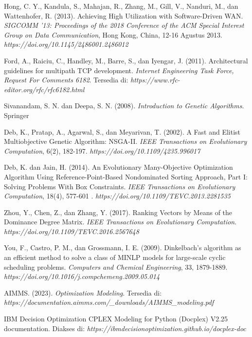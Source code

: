 \begin{thebibliography}{99}
Hong, C. Y., Kandula, S., Mahajan, R., Zhang, M., Gill, V., Nanduri, M., dan Wattenhofer, R. (2013). Achieving High Utilization with Software-Driven WAN. \textit{SIGCOMM '13: Proceedings of the 2018 Conference of the ACM Special Interest Group on Data Communication}, Hong Kong, China, 12-16 Agustus 2013. \textit{https://doi.org/10.1145/2486001.2486012}

Ford, A., Raiciu, C., Handley, M., Barre, S., dan Iyengar, J. (2011). Architectural guidelines for multipath TCP development. \textit{Internet Engineering Task Force, Request For Comments 6182}. Tersedia di: \textit{https://www.rfc-editor.org/rfc/rfc6182.html}

Sivanandam, S. N. dan Deepa, S. N. (2008). \textit{Introduction to Genetic Algorithms}. Springer 


Deb, K., Pratap, A., Agarwal, S., dan Meyarivan, T. (2002). A Fast and Elitist Multiobjective Genetic Algorithm: NSGA-II. \textit{IEEE Transactions on Evolutionary Computation}, 6(2), 182-197. \textit{https://doi.org/10.1109/4235.996017}

Deb, K. dan Jain, H. (2014). An Evolutionary Many-Objective Optimization Algorithm Using Reference-Point-Based Nondominated Sorting Approach, Part I: Solving Problems With Box Constraints. \textit{IEEE Transactions on Evolutionary Computation}, 18(4), 577-601 . \textit{https://doi.org/10.1109/TEVC.2013.2281535}

Zhou, Y., Chen, Z., dan Zhang, Y. (2017). Ranking Vectors by Means of the Dominance Degree Matrix. \textit{IEEE Transactions on Evolutionary Computation}. \textit{https://doi.org/10.1109/TEVC.2016.2567648}

You, F., Castro, P. M., dan Grossmann, I. E. (2009). Dinkelbach’s algorithm as an efficient method to solve a class of MINLP models for large-scale cyclic scheduling problems. \textit{Computers and Chemical Engineering}, 33, 1879-1889. \textit{https://doi.org/10.1016/j.compchemeng.2009.05.014}

AIMMS. (2023). \textit{Optimization Modeling}. Tersedia di: \textit{https://documentation.aimms.com/_downloads/AIMMS_modeling.pdf}


IBM Decision Optimization CPLEX Modeling for Python (Docplex) V2.25 documentation. Diakses di: \textit{https://ibmdecisionoptimization.github.io/docplex-doc}

\end{thebibliography}

